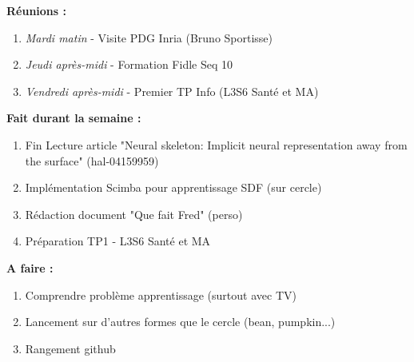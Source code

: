 \textbf{Réunions :}
\begin{enumerate}[label=\textbullet]
	\item \textit{Mardi matin} - Visite PDG Inria (Bruno Sportisse)
	\item \textit{Jeudi après-midi} - Formation Fidle Seq 10
	\item \textit{Vendredi après-midi} - Premier TP Info (L3S6 Santé et MA)
\end{enumerate}
\textbf{Fait durant la semaine :}
\begin{enumerate}[label=\textbullet]
	\item Fin Lecture article "Neural skeleton: Implicit neural representation away from the surface" (hal-04159959)
	\item Implémentation Scimba pour apprentissage SDF (sur cercle)
	\item Rédaction document "Que fait Fred" (perso)
	\item Préparation TP1 - L3S6 Santé et MA
\end{enumerate}
\textbf{A faire :}
\begin{enumerate}[label=\textbullet]
	\item Comprendre problème apprentissage (surtout avec TV)
	\item Lancement sur d'autres formes que le cercle (bean, pumpkin...)
	\item Rangement github
\end{enumerate}
